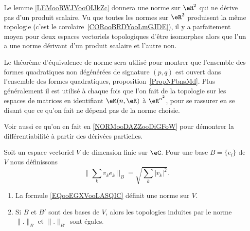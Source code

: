 \begin{normaltext}      \label{NORMooNKBCooKziIjx}
	Le lemme \ref{LEMooRWJYooOIJkZc} donnera une norme sur \( \eR^2\) qui ne dérive pas d'un produit scalaire. Vu que toutes les normes sur \( \eR^2\) produisent la même topologie (c'est le corolaire~\ref{CORooBRDYooLmGJDE}), il y a parfaitement moyen pour deux espaces vectoriels topologiques d'être isomorphes alors que l'un a une norme dérivant d'un produit scalaire et l'autre non.
\end{normaltext}

\begin{normaltext}
	Le théorème d'équivalence de norme sera utilisé pour montrer que l'ensemble des formes quadratiques non dégénérées de signature \( (p,q)\) est ouvert dans l'ensemble des formes quadratiques, proposition~\ref{PropNPbnsMd}. Plus généralement il est utilisé à chaque fois que l'on fait de la topologie sur les espaces de matrices en identifiant \( \eM(n,\eR)\) à \( \eR^{n^2}\), pour se rassurer en se disant que ce qu'on fait ne dépend pas de la norme choisie.

	Voir aussi ce qu'on en fait en \ref{NORMooDAZZooDiGFoW} pour démontrer la différentiabilité à partir des dérivées partielles.
\end{normaltext}

\begin{proposition} \label{PROPooNTCFooEcwZwt}
	Soit un espace vectoriel \( V\) de dimension finie sur \( \eC\). Pour une base \( B= \{ e_i \}\) de \( V\) nous définissons
	\begin{equation}        \label{EQooEGXVooLASQIC}
		\| \sum_kv_ke_k \|_B= \sqrt{ \sum_k| v_k |^2 }.
	\end{equation}
	\begin{enumerate}
		\item
		      La formule \eqref{EQooEGXVooLASQIC} définit une norme sur \( V\).
		\item
		      Si \( B\) et \( B'\) sont des bases de \( V\), alors les topologies induites par le norme \( \| . \|_B\) et \( \| . \|_{B'}\) sont égales.
	\end{enumerate}
\end{proposition}

